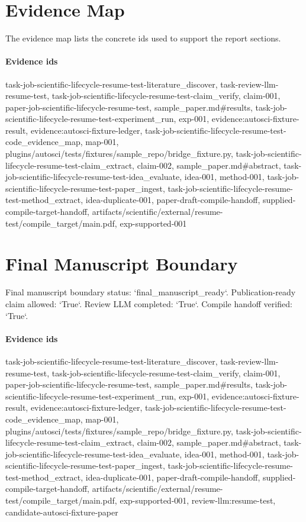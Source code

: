 \documentclass{article}
\begin{document}
\section{Evidence Map}
The evidence map lists the concrete ids used to support the report sections.

\paragraph{Evidence ids} task-job-scientific-lifecycle-resume-test-literature\_discover, task-review-llm-resume-test, task-job-scientific-lifecycle-resume-test-claim\_verify, claim-001, paper-job-scientific-lifecycle-resume-test, sample\_paper.md\#results, task-job-scientific-lifecycle-resume-test-experiment\_run, exp-001, evidence:autosci-fixture-result, evidence:autosci-fixture-ledger, task-job-scientific-lifecycle-resume-test-code\_evidence\_map, map-001, plugins/autosci/tests/fixtures/sample\_repo/bridge\_fixture.py, task-job-scientific-lifecycle-resume-test-claim\_extract, claim-002, sample\_paper.md\#abstract, task-job-scientific-lifecycle-resume-test-idea\_evaluate, idea-001, method-001, task-job-scientific-lifecycle-resume-test-paper\_ingest, task-job-scientific-lifecycle-resume-test-method\_extract, idea-duplicate-001, paper-draft-compile-handoff, supplied-compile-target-handoff, artifacts/scientific/external/resume-test/compile\_target/main.pdf, exp-supported-001

\section{Final Manuscript Boundary}
Final manuscript boundary status: `final\_manuscript\_ready`. Publication-ready claim allowed: `True`. Review LLM completed: `True`. Compile handoff verified: `True`.

\paragraph{Evidence ids} task-job-scientific-lifecycle-resume-test-literature\_discover, task-review-llm-resume-test, task-job-scientific-lifecycle-resume-test-claim\_verify, claim-001, paper-job-scientific-lifecycle-resume-test, sample\_paper.md\#results, task-job-scientific-lifecycle-resume-test-experiment\_run, exp-001, evidence:autosci-fixture-result, evidence:autosci-fixture-ledger, task-job-scientific-lifecycle-resume-test-code\_evidence\_map, map-001, plugins/autosci/tests/fixtures/sample\_repo/bridge\_fixture.py, task-job-scientific-lifecycle-resume-test-claim\_extract, claim-002, sample\_paper.md\#abstract, task-job-scientific-lifecycle-resume-test-idea\_evaluate, idea-001, method-001, task-job-scientific-lifecycle-resume-test-paper\_ingest, task-job-scientific-lifecycle-resume-test-method\_extract, idea-duplicate-001, paper-draft-compile-handoff, supplied-compile-target-handoff, artifacts/scientific/external/resume-test/compile\_target/main.pdf, exp-supported-001, review-llm:resume-test, candidate-autosci-fixture-paper
\end{document}

